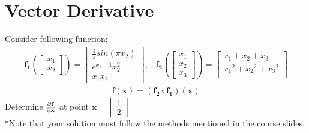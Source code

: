 \documentclass[12pt]{article}
\begin{document}
\section{Vector Derivative}
Consider following function:
\begin{gather*}
    \mathbf{f_1}(\begin{bmatrix}
        x_1 \\
        x_2
    \end{bmatrix}) =
    \begin{bmatrix}
        \frac{1}{\pi} sin(\pi x_2) \\
        e^{x_1 -1}x^{2}_2          \\
        x_1 x_2
    \end{bmatrix}
    , \; \; \;
    \mathbf{f_2}(\begin{bmatrix}
        x_1 \\
        x_2 \\
        x_3
    \end{bmatrix}) =
    \begin{bmatrix}
        x_1 + x_2 + x_3             \\
        {x_1}^2 + {x_2}^2 + {x_3}^2 \\
    \end{bmatrix}
\end{gather*}
\begin{align*}
    \mathbf{f(x)} = (\mathbf{f_2 \circ  f_1})(\mathbf{x})
\end{align*}
Determine $\pdv{\mathbf{f}}{\mathbf{x}}$ at point $\mathbf{x} = \begin{bmatrix}
        1 \\
        2
    \end{bmatrix}$ \\
*Note that your solution must follow the methods mentioned in the course slides.
\end{document}
